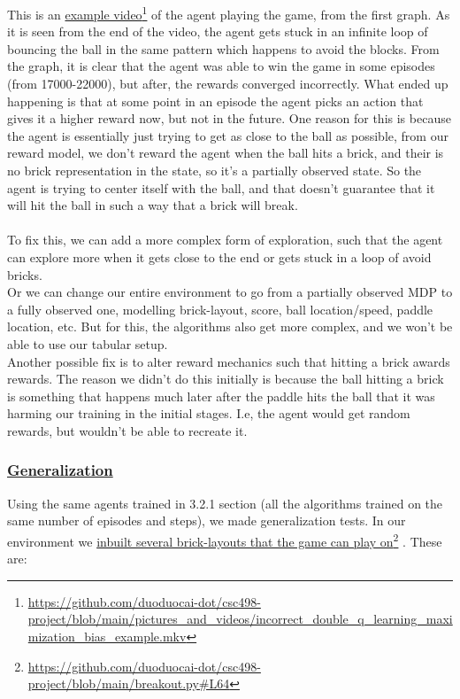 \documentclass[twoside,11pt]{article}
\newcommand\fnurl[2]{%
  \href{#2}{#1}\footnote{\url{#2}}%
}
\begin{document}
This is an \fnurl{example video}{https://github.com/duoduocai-dot/csc498-project/blob/main/pictures_and_videos/incorrect_double_q_learning_maximization_bias_example.mkv} of the agent playing the game, from  the first graph. As it is seen from the end of the  video, the agent gets stuck in an infinite loop of bouncing the ball in the same pattern which happens to avoid the blocks. From the graph, it is clear that the agent was able to win the game in some episodes (from 17000-22000), but after, the rewards converged incorrectly. What ended up happening is that at some point in an episode the agent picks an action that gives it a higher reward now, but not in the future. One reason for this is because the agent is essentially just trying to get as close to the ball as possible, from our reward model, we don't reward the agent when the ball hits a brick, and their is no brick representation in the state, so it's a partially observed state. So the agent is trying to center itself with the ball, and that doesn't guarantee that it will hit the ball in such a way that a brick will break.
\\\\
To fix this, we can add a more complex form of exploration, such that the agent can explore more when it gets close to the end or gets stuck in a loop of avoid bricks.
\\
Or we can change our entire environment to go from a partially observed MDP to a fully observed one, modelling brick-layout, score, ball location/speed, paddle location, etc. But for this, the algorithms also get more complex, and we won't be able to use our tabular setup.
\\
Another possible fix is to alter reward mechanics such that hitting a brick awards rewards. The reason we didn't do this initially is because the ball hitting a brick is something that happens much later after the paddle hits the ball that it was harming our training in the initial stages. I.e, the agent would get random rewards, but wouldn't be able to recreate it.
\subsubsection{\href{https://github.com/duoduocai-dot/csc498-project/blob/main/generalization_tests.py}{Generalization}}
Using the same agents trained in 3.2.1 section (all the algorithms trained on the same number of episodes and steps), we made generalization tests. In our environment we \fnurl{inbuilt several brick-layouts  that the game can play on}{https://github.com/duoduocai-dot/csc498-project/blob/main/breakout.py\#L64}. These are:
\end{document}
